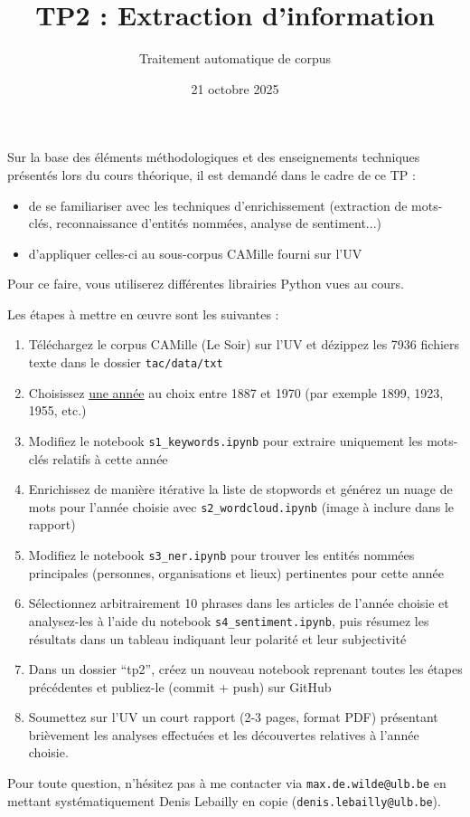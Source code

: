 \documentclass[a4paper,11pt]{article}
\title{TP2 : Extraction d'information}
\author{Traitement automatique de corpus}
\date{21 octobre 2025}
\begin{document}
\maketitle
\thispagestyle{empty}

Sur la base des éléments méthodologiques et des enseignements techniques présentés lors du cours théorique, il est demandé dans le cadre de ce TP :

\begin{itemize}
\item de se familiariser avec les techniques d'enrichissement (extraction de mots-clés, reconnaissance d'entités nommées, analyse de sentiment...)
\item d'appliquer celles-ci au sous-corpus CAMille fourni sur l'UV
\end{itemize}

Pour ce faire, vous utiliserez différentes librairies Python vues au cours.

\vspace{0.7cm}

Les étapes à mettre en \oe uvre sont les suivantes :

\begin{enumerate}
\item Téléchargez le corpus CAMille (Le Soir) sur l'UV et dézippez les 7936 fichiers texte dans le dossier \texttt {tac/data/txt}
\item Choisissez \underline{une année} au choix entre 1887 et 1970 (par exemple 1899, 1923, 1955, etc.)
\item Modifiez le notebook \texttt{s1\_keywords.ipynb} pour extraire uniquement les mots-clés relatifs à cette année
\item Enrichissez de manière itérative la liste de stopwords et générez un nuage de mots pour l'année choisie avec \texttt{s2\_wordcloud.ipynb} (image à inclure dans le rapport)
\item Modifiez le notebook \texttt{s3\_ner.ipynb} pour trouver les entités nommées principales (personnes, organisations et lieux) pertinentes pour cette année
\item Sélectionnez arbitrairement 10 phrases dans les articles de l'année choisie et analysez-les à l'aide du notebook \texttt{s4\_sentiment.ipynb}, puis résumez les résultats dans un tableau indiquant leur polarité et leur subjectivité
\item Dans un dossier \enquote{tp2}, créez un nouveau notebook reprenant toutes les étapes précédentes et publiez-le (commit + push) sur GitHub
\item Soumettez sur l'UV un court rapport (2-3 pages, format PDF) présentant brièvement les analyses effectuées et les découvertes relatives à l'année choisie.%
\end{enumerate}

Pour toute question, n'hésitez pas à me contacter via \texttt{max.de.wilde@ulb.be} en mettant systématiquement Denis Lebailly en copie (\texttt{denis.lebailly@ulb.be}).
\end{document}
